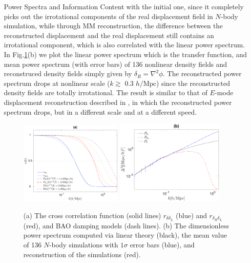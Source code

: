 \begin{section}{Power Spectra and Information Content}
with the initial one, since it completely picks out the irrotational components of the real displacement 
field in $N$-body simulation, while through MM reconstruction, the difference between the reconstructed displacement 
and the real displacement still contains an irrotational component, which is also correlated with the linear power spectrum.
 In Fig.\ref{fig:cross-correlation-power}(b) we plot the linear power spectrum which is the transfer function, and mean 
power spectrum (with error bars) of 136 nonlinear density fields and reconstruced density fields simply 
given by $\delta_R=\nabla^2\phi$. The reconstructed power spectrum drops at nonlinear scale ($k \gtrsim$ 0.3 $h/\mathrm{Mpc}$) 
since the reconstructed density fields are totally irrotational. The result is similar to that of 
$E$-mode displacement reconstruction described in \cite{bib:Yu2016}, in which the reconstructed power spectrum 
drops, but in a different scale and at a different speed.
\begin{figure}
\centering
\includegraphics[width=0.455\textwidth]{cross_correlation_best_analysis-crop.pdf} 
\includegraphics[width=0.48\textwidth]{power_best_analysis-crop.pdf}
\caption{(a) The cross correlation function (solid lines) $r_{\delta\delta_L}$ (blue) and $r_{\delta_R\delta_L}$ (red), 
and BAO damping models (dash lines). 
(b) The dimensionless power spectrum computed via linear theory (black), the mean value of 136 $N$-body simulations
with $1\sigma$ error bars (blue), and reconstruction of the simulations (red).}
\label{fig:cross-correlation-power}
\end{figure}


\end{section}
